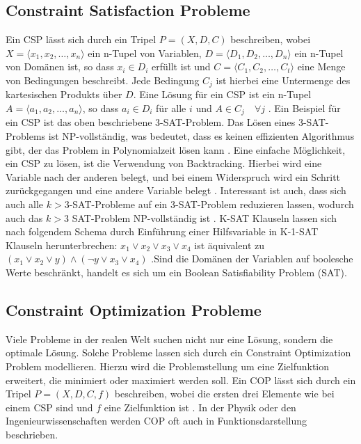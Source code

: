 \subsection{Constraint Satisfaction Probleme}
\label{sec:Constraint-Satisfaction-Probleme}

Ein CSP lässt sich durch ein Tripel \(P=(X,D,C)\) beschreiben, wobei \(X=\langle
x_{1},x_{2},\ldots,x_{n}\rangle\) ein n-Tupel von Variablen, \(D=\langle
D_{1},D_{2},\ldots,D_{n}\rangle\) ein n-Tupel von Domänen ist, so dass \(x_i\in
D_{i}\) erfüllt ist und \(C=\langle C_1,C_2,\ldots,C_t\rangle\) eine Menge von
Bedingungen beschreibt. Jede Bedingung \(C_j\) ist hierbei eine Untermenge des
kartesischen Produkts über \(D\). Eine Lösung für ein CSP ist ein n-Tupel
\(A=\langle a_1,a_2,\ldots,a_n\rangle \), so dass \(a_i\in D_i\) für alle \(i\)
und \(A \in C_j \quad \forall j\) \cite[16]{rossi06bo}. Ein Beispiel für ein CSP
ist das oben beschriebene 3-SAT-Problem. Das Lösen eines 3-SAT-Problems ist
NP-vollständig, was bedeutet, dass es keinen effizienten Algorithmus gibt, der
das Problem in Polynomialzeit lösen kann \cite[17]{rossi06bo}. Eine einfache
Möglichkeit, ein CSP zu lösen, ist die Verwendung von Backtracking. Hierbei wird
eine Variable nach der anderen belegt, und bei einem Widerspruch wird ein
Schritt zurückgegangen und eine andere Variable belegt \cite[85]{rossi06bo}.
Interessant ist auch, dass sich auch alle \(k>3\)-SAT-Probleme auf ein
3-SAT-Problem reduzieren lassen, wodurch auch das \(k>3\) SAT-Problem
NP-vollständig ist \cite[206]{gritz13bo}. \mbox{K-SAT} Klauseln lassen sich
nach folgendem Schema durch Einführung einer Hilfsvariable in
\mbox{K-1-SAT} Klauseln herunterbrechen: $x_1 \vee x_2 \vee x_3 \vee
x_4$ ist äquivalent zu $(x_1 \vee x_2 \vee y) \wedge (\lnot y \vee x_3 \vee
x_4)$ .Sind die Domänen der Variablen auf boolesche Werte beschränkt, handelt es
sich um ein Boolean Satisfiability Problem (SAT).


\subsection{Constraint Optimization Probleme}
\label{sec:Constraint-Optimization-Probleme}

Viele Probleme in der realen Welt suchen nicht nur eine Lösung, sondern die
optimale Lösung. Solche Probleme lassen sich durch ein Constraint Optimization
Problem modellieren. Hierzu wird die Problemstellung um eine Zielfunktion
erweitert, die minimiert oder maximiert werden soll. Ein COP lässt sich durch
ein Tripel \(P=(X,D,C,f)\) beschreiben, wobei die ersten drei Elemente wie bei
einem CSP sind und \(f\) eine Zielfunktion ist \cite[22]{amadi15jo}. In der
Physik oder den Ingenieurwissenschaften werden COP oft auch in
Funktionsdarstellung beschrieben.

